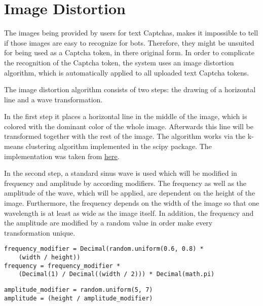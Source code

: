 \section{Image Distortion}
\label{sec:image_distortion}

The images being provided by users for text Captchas, makes it impossible to tell if those images are easy to recognize for bots. Therefore, they might be unsuited for being used as a Captcha token, in there original form. In order to complicate the recognition of the Captcha token, the system uses an image distortion algorithm, which is automatically applied to all uploaded text Captcha tokens.

The image distortion algorithm consists of two steps: the drawing of a horizontal line and a wave transformation.

In the first step it places a horizontal line in the middle of the image, which is colored with the dominant color of the whole image. Afterwards this line will be transformed together with the rest of the image.
The algorithm works via the k-means clustering algorithm implemented in the scipy package. The implementation was taken from \href{http://stackoverflow.com/questions/3241929/python-find-dominant-most-common-color-in-an-image}{\underline{here}}.

In the second step, a standard sinus wave is used which will be modified in frequency and amplitude by according modifiers. The frequency as well as the amplitude of the wave, which will be applied, are dependent on the height of the image. Furthermore, the frequency depends on the width of the image so that one wavelength is at least as wide as the image itself. In addition, the frequency and the amplitude are modified by a random value in order make every transformation unique.

\begin{lstlisting}[style=std]
frequency_modifier = Decimal(random.uniform(0.6, 0.8) *
	(width / height))
frequency = frequency_modifier *
	(Decimal(1) / Decimal((width / 2))) * Decimal(math.pi)
\end{lstlisting}

\begin{lstlisting}[style=std]
amplitude_modifier = random.uniform(5, 7)
amplitude = (height / amplitude_modifier)
\end{lstlisting}

%

